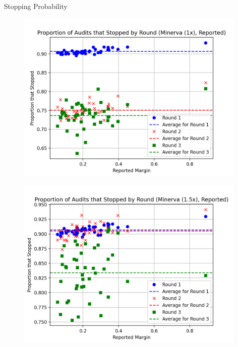 \documentclass[final]{beamer}
\newcommand{\Minerva}{\textsc{Minerva}\xspace}
\newlength{\colwidth}
\begin{document}
\begin{frame}[t]
\begin{columns}[t]
\begin{column}{\colwidth}
\begin{block}{Stopping Probability}
\begin{figure}[h]
\begin{minipage}{.49\textwidth}
\begin{centering}
\includegraphics[width=1\textwidth]{minerva_multiround_1x_10^4/sprobs_first_three.png}
\label{fig:minerva1_sprob}
\end{centering}
\end{minipage}
\begin{minipage}{.49\textwidth}
\begin{centering}
\includegraphics[width=1\textwidth]{minerva_multiround_1p5x_10^4/sprobs_first_three.png}

\end{centering}
\end{minipage}
\end{figure}
\end{block}
\end{column}
\end{columns}
\end{frame}
\end{document}
